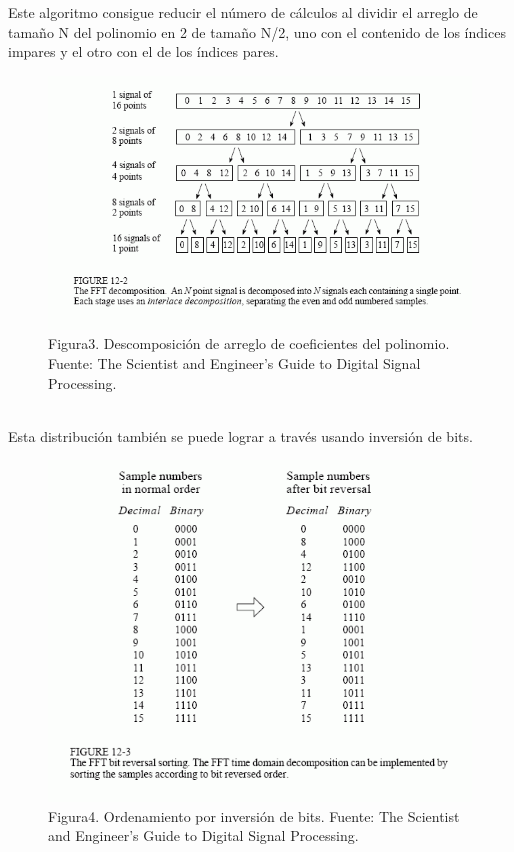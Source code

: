 \documentclass[review,1p]{elsarticle}
\begin{document}
Este algoritmo consigue reducir el número de cálculos al dividir el arreglo de tamaño N del polinomio en 2 de tamaño N/2, uno con el contenido de los índices impares y el otro con el de los índices pares. \\
\begin{figure}[ht]
    \centering
    \includegraphics[scale=0.9]{Figuras/F_12_2.png}
    \\
    \small Figura3. Descomposición de arreglo de coeficientes del polinomio. Fuente: The Scientist and Engineer's Guide to Digital Signal Processing.
\end{figure}\\
Esta distribución también se puede lograr a través usando inversión de bits.\\
\begin{figure}[h]
    \centering
    \includegraphics[scale=0.9]{Figuras/F_12_3.png}
    \\
    \small Figura4. Ordenamiento por inversión de bits. Fuente: The Scientist and Engineer's Guide to Digital Signal Processing.
\end{figure}
\end{document}

